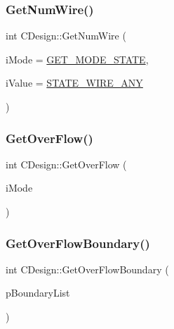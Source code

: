 \subsubsection{\texorpdfstring{GetNumWire()}{GetNumWire()}}
{\footnotesize\ttfamily int C\+Design\+::\+Get\+Num\+Wire (\begin{DoxyParamCaption}\item[{int}]{i\+Mode = {\ttfamily \mbox{\hyperlink{BoxRouter_8h_a6f72f2cc9dd31793dd832ccfb2547de4}{G\+E\+T\+\_\+\+M\+O\+D\+E\+\_\+\+S\+T\+A\+TE}}},  }\item[{int}]{i\+Value = {\ttfamily \mbox{\hyperlink{BoxRouter_8h_a1b285251edd87e1423189470586cc719}{S\+T\+A\+T\+E\+\_\+\+W\+I\+R\+E\+\_\+\+A\+NY}}} }\end{DoxyParamCaption})}

\mbox{\label{classCDesign_affc3b0b72b0991118a2141e11cbdab6e}} 
\subsubsection{\texorpdfstring{GetOverFlow()}{GetOverFlow()}}
{\footnotesize\ttfamily int C\+Design\+::\+Get\+Over\+Flow (\begin{DoxyParamCaption}\item[{int}]{i\+Mode }\end{DoxyParamCaption})}

\mbox{\label{classCDesign_af264117726c361d0404dcd97c6da2c35}} 
\subsubsection{\texorpdfstring{GetOverFlowBoundary()}{GetOverFlowBoundary()}}
{\footnotesize\ttfamily int C\+Design\+::\+Get\+Over\+Flow\+Boundary (\begin{DoxyParamCaption}\item[{vector$<$ \mbox{\hyperlink{classCBoundary}{C\+Boundary}} $\ast$ $>$ $\ast$}]{p\+Boundary\+List }\end{DoxyParamCaption})}

\mbox{\label{classCDesign_a0612a39d1690b74618229f2b88a8ccb0}} 
